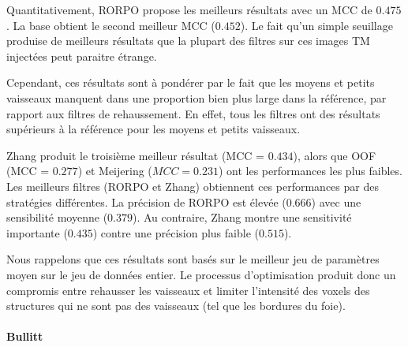 Quantitativement, RORPO propose les meilleurs résultats avec un MCC de $0.475$. La base obtient le second meilleur MCC ($0.452$). Le fait qu'un simple seuillage produise de meilleurs résultats que la plupart des filtres sur ces images TM injectées peut paraitre étrange.

Cependant, ces résultats sont à pondérer par le fait que les moyens et petits vaisseaux manquent dans une proportion bien plus large dans la référence, par rapport aux filtres de rehaussement. En effet, tous les filtres ont des résultats supérieurs à la référence pour les moyens et petits vaisseaux.  

Zhang produit le troisième meilleur résultat (MCC = $0.434$), alors que OOF (MCC = $0.277$) et Meijering ($MCC = 0.231$) ont les performances les plus faibles. Les meilleurs filtres (RORPO et Zhang) obtiennent ces performances par des stratégies différentes. La précision de RORPO est élevée ($0.666$) avec une sensibilité moyenne ($0.379$). Au contraire, Zhang montre une sensitivité importante ($0.435$) contre une précision plus faible ($0.515$).

Nous rappelons que ces résultats sont basés sur le meilleur jeu de paramètres moyen sur le jeu de données entier. Le processus d'optimisation produit donc un compromis entre rehausser les vaisseaux et limiter l'intensité des voxels des structures qui ne sont pas des vaisseaux (tel que les bordures du foie). 

\paragraph{Bullitt}

